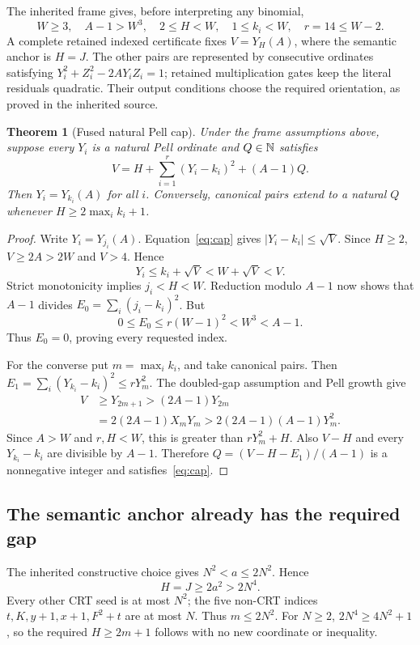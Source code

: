 \documentclass[11pt,letterpaper]{article}
\newtheorem{theorem}{Theorem}[section]
\theoremstyle{definition}\newtheorem{definition}[theorem]{Definition}
\theoremstyle{remark}\newtheorem{remark}[theorem]{Remark}
\begin{document}
The inherited frame gives, before interpreting any binomial,
\[
 W\ge3,\quad A-1>W^3,\quad 2\le H<W,\quad
 1\le k_i<W,\quad r=14\le W-2.
\]
A complete retained indexed certificate fixes \(V=Y_H(A)\), where
the semantic anchor is \(H=J\). The other pairs are represented by
consecutive ordinates satisfying
\(Y_i^2+Z_i^2-2AY_iZ_i=1\); retained multiplication gates keep the
literal residuals quadratic. Their output conditions choose the required
orientation, as proved in the inherited source.

\begin{theorem}[Fused natural Pell cap]\label{thm:cap}
Under the frame assumptions above, suppose every \(Y_i\) is a natural
Pell ordinate and \(Q\in\mathbb N\) satisfies
\begin{equation}\label{eq:cap}
 \boxed{V=H+\sum_{i=1}^{r}(Y_i-k_i)^2+(A-1)Q.}
\end{equation}
Then \(Y_i=Y_{k_i}(A)\) for all \(i\). Conversely, canonical pairs
extend to a natural \(Q\) whenever \(H\ge2\max_i k_i+1\).
\end{theorem}
\begin{proof}
Write \(Y_i=Y_{j_i}(A)\). Equation~\eqref{eq:cap} gives
\(|Y_i-k_i|\le\sqrt V\). Since \(H\ge2\),
\(V\ge2A>2W\) and \(V>4\). Hence
\[
 Y_i\le k_i+\sqrt V<W+\sqrt V<V.
\]
Strict monotonicity implies \(j_i<H<W\). Reduction modulo \(A-1\)
now shows that \(A-1\) divides
\(E_0=\sum_i(j_i-k_i)^2\). But
\[
 0\le E_0\le r(W-1)^2<W^3<A-1.
\]
Thus \(E_0=0\), proving every requested index.

For the converse put \(m=\max_i k_i\), and take canonical pairs.
Then \(E_1=\sum_i(Y_{k_i}-k_i)^2\le rY_m^2\). The doubled-gap
assumption and Pell growth give
\begin{align*}
 V&\ge Y_{2m+1}>(2A-1)Y_{2m}\\
  &=2(2A-1)X_mY_m
   >2(2A-1)(A-1)Y_m^2.
\end{align*}
Since \(A>W\) and \(r,H<W\), this is greater than
\(rY_m^2+H\). Also \(V-H\) and every \(Y_{k_i}-k_i\) are divisible
by \(A-1\). Therefore \(Q=(V-H-E_1)/(A-1)\) is a nonnegative
integer and satisfies~\eqref{eq:cap}.
\end{proof}

\subsection{The semantic anchor already has the required gap}

The inherited constructive choice gives \(N^2<a\le2N^2\). Hence
\[
 H=J\ge2a^2>2N^4.
\]
Every other CRT seed is at most \(N^2\); the five non-CRT indices
\(t,K,y+1,x+1,F^2+t\) are at most \(N\). Thus
\(m\le2N^2\). For \(N\ge2\), \(2N^4\ge4N^2+1\), so the required
\(H\ge2m+1\) follows with no new coordinate or inequality.
\end{document}
